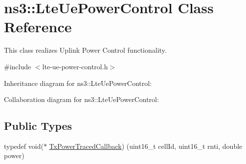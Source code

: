 \hypertarget{classns3_1_1LteUePowerControl}{}\section{ns3\+:\+:Lte\+Ue\+Power\+Control Class Reference}
\label{classns3_1_1LteUePowerControl}


This class realizes Uplink Power Control functionality.  




{\ttfamily \#include $<$lte-\/ue-\/power-\/control.\+h$>$}



Inheritance diagram for ns3\+:\+:Lte\+Ue\+Power\+Control\+:


Collaboration diagram for ns3\+:\+:Lte\+Ue\+Power\+Control\+:
\subsection*{Public Types}
\begin{DoxyCompactItemize}
\item 
typedef void($\ast$ \hyperlink{classns3_1_1LteUePowerControl_a984157b65e3f19fdb73063def0956ee9}{Tx\+Power\+Traced\+Callback}) (uint16\+\_\+t cell\+Id, uint16\+\_\+t rnti, double power)
\end{DoxyCompactItemize}
